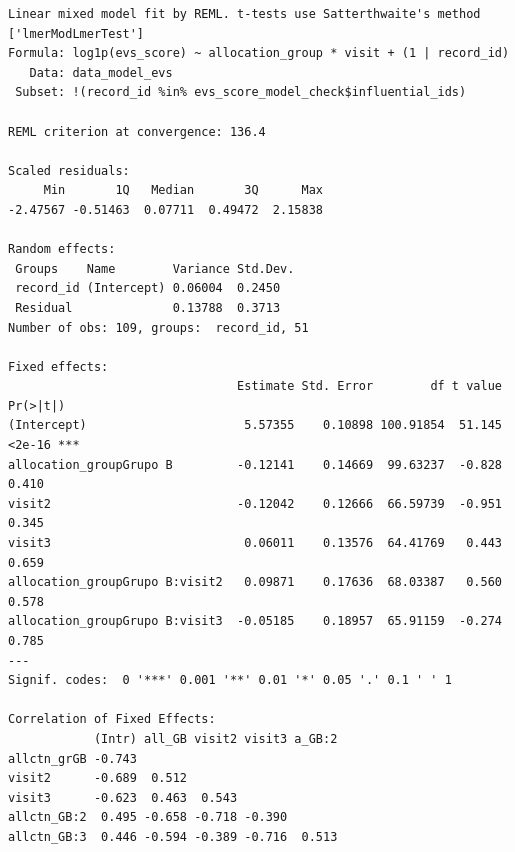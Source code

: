 \documentclass[
  12pt,
]{article}
\newenvironment{Shaded}{\begin{snugshade}}{\end{snugshade}}
\newcommand{\NormalTok}[1]{\textcolor[rgb]{0.00,0.23,0.31}{#1}}
\newcommand{\SpecialCharTok}[1]{\textcolor[rgb]{0.37,0.37,0.37}{#1}}
\begin{document}
\begin{verbatim}
Linear mixed model fit by REML. t-tests use Satterthwaite's method ['lmerModLmerTest']
Formula: log1p(evs_score) ~ allocation_group * visit + (1 | record_id)
   Data: data_model_evs
 Subset: !(record_id %in% evs_score_model_check$influential_ids)

REML criterion at convergence: 136.4

Scaled residuals: 
     Min       1Q   Median       3Q      Max 
-2.47567 -0.51463  0.07711  0.49472  2.15838 

Random effects:
 Groups    Name        Variance Std.Dev.
 record_id (Intercept) 0.06004  0.2450  
 Residual              0.13788  0.3713  
Number of obs: 109, groups:  record_id, 51

Fixed effects:
                                Estimate Std. Error        df t value Pr(>|t|)    
(Intercept)                      5.57355    0.10898 100.91854  51.145   <2e-16 ***
allocation_groupGrupo B         -0.12141    0.14669  99.63237  -0.828    0.410    
visit2                          -0.12042    0.12666  66.59739  -0.951    0.345    
visit3                           0.06011    0.13576  64.41769   0.443    0.659    
allocation_groupGrupo B:visit2   0.09871    0.17636  68.03387   0.560    0.578    
allocation_groupGrupo B:visit3  -0.05185    0.18957  65.91159  -0.274    0.785    
---
Signif. codes:  0 '***' 0.001 '**' 0.01 '*' 0.05 '.' 0.1 ' ' 1

Correlation of Fixed Effects:
            (Intr) all_GB visit2 visit3 a_GB:2
allctn_grGB -0.743                            
visit2      -0.689  0.512                     
visit3      -0.623  0.463  0.543              
allctn_GB:2  0.495 -0.658 -0.718 -0.390       
allctn_GB:3  0.446 -0.594 -0.389 -0.716  0.513
\end{verbatim}

\begin{Shaded}
\end{Shaded}
\end{document}
